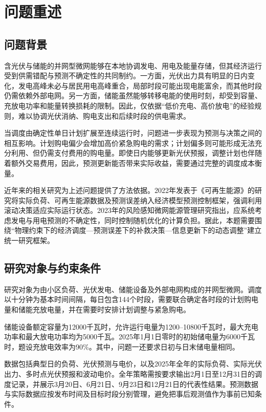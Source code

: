 \documentclass[UTF8,a4paper,12pt,fontset=fandol]{ctexart}
\numberwithin{equation}{section}
\begin{document}
\section{问题重述}
\label{sec:restatement}

\subsection{问题背景}

含光伏与储能的并网型微网能够在本地协调发电、用电及能量存储，但其经济运行受到供需错配与预测不确定性的共同制约。一方面，光伏出力具有明显的日内变化，发电高峰未必与居民用电高峰重合，局部时段可能出现电能富余，而其他时段仍需依赖外部电网。另一方面，储能虽然能够转移电能的使用时刻，却受到容量、充放电功率和能量转换损耗的限制。因此，仅依据“低价充电、高价放电”的经验规则，难以协调光伏消纳、购电支出和后续时段的供电需求。

当调度由确定性单日计划扩展至连续运行时，问题进一步表现为预测与决策之间的相互影响。计划购电偏少会增加高价紧急购电的需求；计划偏多则可能形成无法充分利用、但仍需支付费用的购电量。即使日内能够更新光伏预报，调整计划也伴随着额外交易费用，因此，预测更新能否带来实际收益，需要通过完整的调度成本衡量。

近年来的相关研究为上述问题提供了方法依据。2022年发表于《可再生能源》的研究将实际负荷、可再生能源数据及预测误差纳入经济模型预测控制框架，强调利用滚动决策适应实际运行状态\cite{economic2022}。2023年的风险感知微网能源管理研究指出，应系统考虑发电与用电预测的不确定性，同时控制随机优化的计算负担\cite{riskaware2023}。据此，本题需要围绕“物理约束下的经济调度---预测误差下的补救决策---信息更新下的动态调整”建立统一研究框架。

\subsection{研究对象与约束条件}

研究对象为由小区负荷、光伏发电、储能设备及外部电网构成的并网型微网。调度以十分钟为基本时间间隔，每日包含144个时段，需要联合确定各时段的计划购电量和储能充放电量，并在需要时安排计划调整与紧急购电。

储能设备额定容量为12000千瓦时，允许运行电量为1200--10800千瓦时，最大充电功率和最大放电功率均为5000千瓦。2025年1月1日零时的初始储电量为6000千瓦时，题设充放电效率为90\%。其中，问题一还要求日初与日末储电量相同。

数据包括典型日的负荷、光伏预测与电价，以及2025年全年的实际负荷、实际光伏出力、多时点光伏预报和波动电价。全年策略需按要求输出2月1日至12月31日的调度记录，并展示3月20日、6月21日、9月23日和12月21日的代表性结果。预测数据与实际数据应按发布时间及目标时段分别管理，避免把事后观测值作为事前已知条件。
\end{document}
